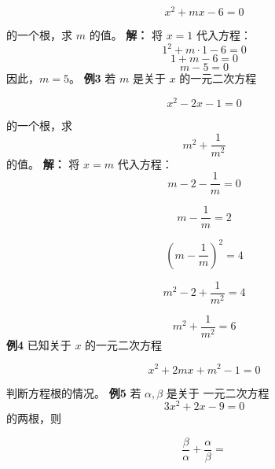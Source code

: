 \documentclass[12pt]{article}
\begin{document}
\[
  x^2 + mx - 6 = 0
\]


的一个根，求 \(m\) 的值。
\newline
\textbf{解：}
将 \(x = 1\) 代入方程：
\[
  1^2 + m \cdot 1 - 6 = 0
\]
\[
  1 + m - 6 = 0
\]
\[
  m - 5 = 0
\]
因此，\(m = 5\)。\newline
\textbf{例3} 若 \(m\) 是关于 \(x\) 的一元二次方程


\[
  x^2 -2x - 1 = 0
\]


的一个根，求 \[
  m^2+\frac{1}{m^2}  \]的值。
\newline
\textbf{解：}
将 \(x = m\) 代入方程：
\[
  m - 2 - \frac{1}{m} = 0
\]

\[
  m - \frac{1}{m} = 2
\]

\[
  \left(m - \frac{1}{m}\right)^2 = 4
\]

\[
  m^2 - 2 + \frac{1}{m^2} = 4
\]

\[
  m^2 + \frac{1}{m^2} = 6
\] \newline
\textbf{例4} 已知关于 \(x\) 的一元二次方程


\[
  x^2 +2mx +m^2 - 1 = 0
\]

判断方程根的情况。
\newline
\textbf{例5} 若 $\alpha, \beta$ 是关于 一元二次方程
\[
  3x^2 +2x -9 = 0
\]
的两根，则


\[
  \frac{\beta}{\alpha} + \frac{\alpha}{\beta} =
\]
\end{document}
